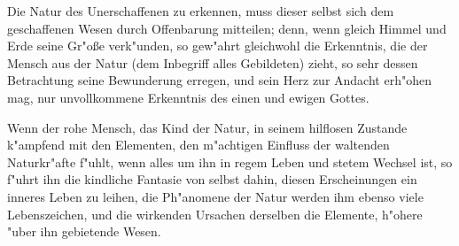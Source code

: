 \documentclass[a4paper, 11pt, oneside, polutonikogreek, german]{article}
\begin{document}
Die Natur des Unerschaffenen zu erkennen, muss dieser selbst sich dem geschaffenen Wesen durch Offenbarung mitteilen; denn, wenn gleich Himmel und Erde seine Gr"oße verk"unden, so gew"ahrt gleichwohl die Erkenntnis, die der Mensch aus der Natur (dem Inbegriff alles Gebildeten) zieht, so sehr dessen Betrachtung seine Bewunderung erregen, und sein Herz zur Andacht erh"ohen mag, nur unvollkommene Erkenntnis des einen und ewigen Gottes.

Wenn der rohe Mensch, das Kind der Natur, in seinem hilflosen Zustande k"ampfend mit den Elementen, den m"achtigen Einfluss der waltenden Naturkr"afte f"uhlt, wenn alles um ihn in regem Leben und stetem Wechsel ist, so f"uhrt ihn die kindliche Fantasie von selbst dahin, diesen Erscheinungen ein inneres Leben zu leihen, die Ph"anomene der Natur werden ihm ebenso viele Lebenszeichen, und die wirkenden Ursachen derselben die Elemente, h"ohere "uber ihn gebietende Wesen.
\end{document}
